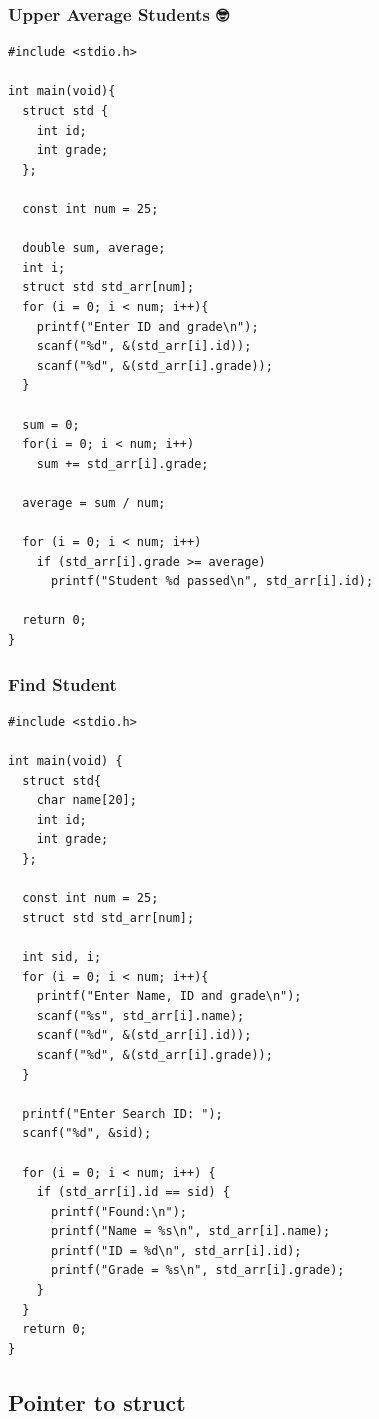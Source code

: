 \documentclass{../c-lecture}
\begin{document}
\begin{frame}[fragile]
  \frametitle{Upper Average Students 🤓}
  \scriptsize
  \begin{verbatim}
#include <stdio.h>

int main(void){
  struct std {
    int id;
    int grade;
  };

  const int num = 25;

  double sum, average;
  int i;
  struct std std_arr[num];
  for (i = 0; i < num; i++){
    printf("Enter ID and grade\n");
    scanf("%d", &(std_arr[i].id));
    scanf("%d", &(std_arr[i].grade));
  }

  sum = 0;
  for(i = 0; i < num; i++)
    sum += std_arr[i].grade;

  average = sum / num;

  for (i = 0; i < num; i++)
    if (std_arr[i].grade >= average)
      printf("Student %d passed\n", std_arr[i].id);

  return 0;
}
  \end{verbatim}
\end{frame}

\begin{frame}[fragile]
  \frametitle{Find Student}
  \scriptsize
  \begin{verbatim}
#include <stdio.h>

int main(void) {
  struct std{
    char name[20];
    int id;
    int grade;
  };

  const int num = 25;
  struct std std_arr[num];

  int sid, i;
  for (i = 0; i < num; i++){
    printf("Enter Name, ID and grade\n");
    scanf("%s", std_arr[i].name);
    scanf("%d", &(std_arr[i].id));
    scanf("%d", &(std_arr[i].grade));
  }

  printf("Enter Search ID: ");
  scanf("%d", &sid);

  for (i = 0; i < num; i++) {
    if (std_arr[i].id == sid) {
      printf("Found:\n");
      printf("Name = %s\n", std_arr[i].name);
      printf("ID = %d\n", std_arr[i].id);
      printf("Grade = %s\n", std_arr[i].grade);
    }
  }
  return 0;
}
  \end{verbatim}
\end{frame}

\subsection{Pointer to struct}
\end{document}
